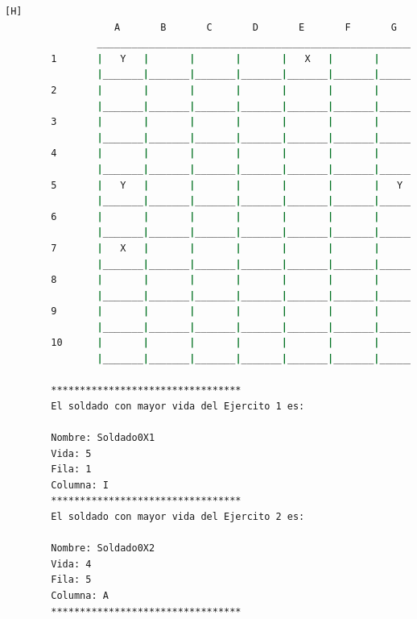 \documentclass{article}
\begin{document}
\begin{lstlisting}[language=bash,caption={La ejecución: \textcolor{red}{PARA PODER VER LA TABLA COMPLETAMENTE MIRAR LA PLANTILLA DE LATEX O EJECUTARLO: }}][H]
				   A       B       C       D       E       F       G       H       I       J
				_________________________________________________________________________________
		1       |   Y   |       |       |       |   X   |       |       |       |   X   |       |
				|_______|_______|_______|_______|_______|_______|_______|_______|_______|_______|
		2       |       |       |       |       |       |       |       |       |       |       |
				|_______|_______|_______|_______|_______|_______|_______|_______|_______|_______|
		3       |       |       |       |       |       |       |       |       |       |       |
				|_______|_______|_______|_______|_______|_______|_______|_______|_______|_______|
		4       |       |       |       |       |       |       |       |       |       |       |
				|_______|_______|_______|_______|_______|_______|_______|_______|_______|_______|
		5       |   Y   |       |       |       |       |       |   Y   |       |       |       |
				|_______|_______|_______|_______|_______|_______|_______|_______|_______|_______|
		6       |       |       |       |       |       |       |       |   X   |       |       |
				|_______|_______|_______|_______|_______|_______|_______|_______|_______|_______|
		7       |   X   |       |       |       |       |       |       |       |       |       |
				|_______|_______|_______|_______|_______|_______|_______|_______|_______|_______|
		8       |       |       |       |       |       |       |       |       |       |       |
				|_______|_______|_______|_______|_______|_______|_______|_______|_______|_______|
		9       |       |       |       |       |       |       |       |       |       |       |
				|_______|_______|_______|_______|_______|_______|_______|_______|_______|_______|
		10      |       |       |       |       |       |       |       |       |       |   Y   |
				|_______|_______|_______|_______|_______|_______|_______|_______|_______|_______|
		
		*********************************
		El soldado con mayor vida del Ejercito 1 es: 
		
		Nombre: Soldado0X1
		Vida: 5
		Fila: 1
		Columna: I
		*********************************
		El soldado con mayor vida del Ejercito 2 es: 
		
		Nombre: Soldado0X2
		Vida: 4
		Fila: 5
		Columna: A
		*********************************
	\end{lstlisting}
\end{document}
